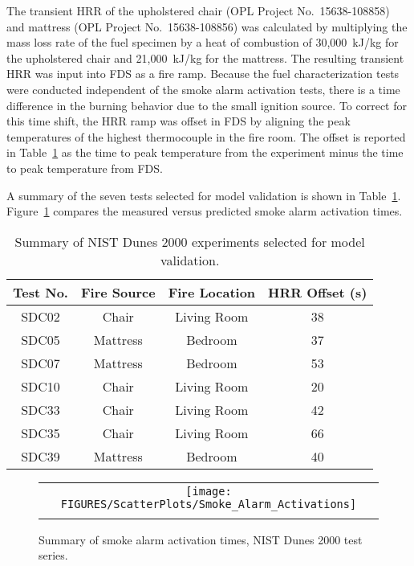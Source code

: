 The transient HRR of the upholstered chair (OPL Project No.~15638-108858) and
mattress (OPL Project No.~15638-108856) was calculated by multiplying the mass loss rate of the
fuel specimen by a heat of combustion of 30,000~kJ/kg for the upholstered chair and 21,000~kJ/kg for the mattress.
The resulting transient HRR was input into FDS as a fire ramp.
Because the fuel characterization tests were conducted independent of the smoke alarm activation tests,
there is a time difference in the burning behavior due to the small ignition source. To correct for this time shift,
the HRR ramp was offset in FDS by aligning the peak temperatures of the highest thermocouple in the
fire room. The offset is reported in Table~\ref{NIST_Dunes_2000_Summary} as the time to peak temperature
from the experiment minus the time to peak temperature from FDS.

A summary of the seven tests selected for model validation is shown in Table~\ref{NIST_Dunes_2000_Summary}.
Figure~\ref{NIST_Dunes_2000_Scatterplot} compares the measured versus predicted smoke alarm activation times.

\begin{table}[h!]
\caption{Summary of NIST Dunes 2000 experiments selected for model validation.}
\begin{center}
\begin{tabular}{|c|c|c|c|}
\hline
Test No.  &  Fire Source  &  Fire Location  &  HRR Offset (s)  \\ \hline \hline
SDC02     &  Chair        &  Living Room    &  38              \\ \hline
SDC05     &  Mattress     &  Bedroom        &  37              \\ \hline
SDC07     &  Mattress     &  Bedroom        &  53              \\ \hline
SDC10     &  Chair        &  Living Room    &  20              \\ \hline
SDC33     &  Chair        &  Living Room    &  42              \\ \hline
SDC35     &  Chair        &  Living Room    &  66              \\ \hline
SDC39     &  Mattress     &  Bedroom        &  40              \\ \hline
\end{tabular}
\end{center}
\label{NIST_Dunes_2000_Summary}
\end{table}

\begin{figure}[p]
\begin{center}
\begin{tabular}{c}
\texttt{[image: FIGURES/ScatterPlots/Smoke\_Alarm\_Activations]} \\
\vspace{0.25in}
\end{tabular}
\end{center}
\caption[Summary of smoke alarm activation times, NIST Dunes 2000 test series.]
{Summary of smoke alarm activation times, NIST Dunes 2000 test series.}
\label{NIST_Dunes_2000_Scatterplot}
\end{figure}

